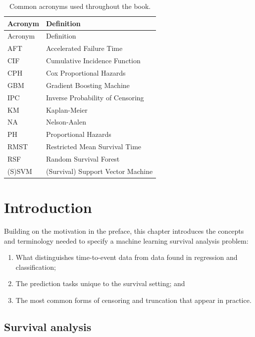 \documentclass[
  letterpaper,
  krantz2]{style/krantz}
\providecommand{\tightlist}{%
  \setlength{\itemsep}{0pt}\setlength{\parskip}{0pt}}
\begin{document}
\begin{longtable}[]{@{}ll@{}}
\caption{Common acronyms used throughout the
book.}\label{tbl-not-acr}\tabularnewline
\toprule\noalign{}
Acronym & Definition \\
\midrule\noalign{}
\endfirsthead
\toprule\noalign{}
Acronym & Definition \\
\midrule\noalign{}
\endhead
\bottomrule\noalign{}
\endlastfoot
AFT & Accelerated Failure Time \\
CIF & Cumulative Incidence Function \\
CPH & Cox Proportional Hazards \\
GBM & Gradient Boosting Machine \\
IPC & Inverse Probability of Censoring \\
KM & Kaplan-Meier \\
NA & Nelson-Aalen \\
PH & Proportional Hazards \\
RMST & Restricted Mean Survival Time \\
RSF & Random Survival Forest \\
(S)SVM & (Survival) Support Vector Machine \\
\end{longtable}

\mainmatter
{}

\chapter{Introduction}\label{sec-intro}

Building on the motivation in the preface, this chapter introduces the
concepts and terminology needed to specify a machine learning survival
analysis problem:

\begin{enumerate}
\def\labelenumi{\arabic{enumi}.}
\tightlist
\item
  What distinguishes time-to-event data from
  data found in regression and
  classification;
\item
  The prediction tasks unique to the survival setting; and
\item
  The most common forms of censoring and
  truncation that appear in practice.
\end{enumerate}

\section{Survival analysis}\label{sec-intro-def}
\end{document}
